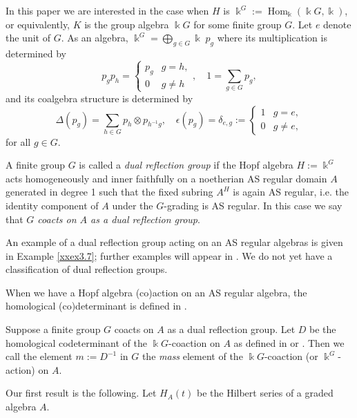 In this paper we are interested in the case
when $H$ is $\Bbbk^G:=\operatorname{Hom}_{\Bbbk}(\Bbbk G, \Bbbk)$, or 
equivalently, $K$ is the group algebra $\Bbbk G$ for some finite
group $G$. Let $e$ denote the unit of $G$. As an algebra,
$\Bbbk^G=\bigoplus_{g\in G} \Bbbk \; p_g$ where its multiplication 
is determined by
$$p_g p_h=\begin{cases} p_g & g=h,\\0 & g\neq h \end{cases}, 
\quad 1=\sum_{g\in G} p_g,$$
and its coalgebra structure is determined by
$$\Delta(p_g)=\sum_{h\in G} p_h \otimes p_{h^{-1}g}, \quad 
\epsilon(p_{g})=\delta_{e,g}:=\begin{cases} 1 & g=e,\\ 0 & g\neq e,
\end{cases}$$
for all $g\in G$. 

\begin{definition}
\label{xxdef0.1} A finite group $G$ is called a 
{\it dual reflection group} if the Hopf algebra $H:=\Bbbk^G$ acts
homogeneously and inner faithfully on a noetherian AS regular 
domain $A$ generated in degree 1 such that the fixed subring 
$A^H$ is again AS regular, i.e. the identity component of $A$ under the $G$-grading is AS regular. In this case we say that 
{\it $G$ coacts on $A$ as a dual reflection group}.  
\end{definition}

An example of a dual reflection group acting on an
AS regular algebras is given in Example \ref{xxex3.7}; further examples will appear in
\cite{KKZ5}.  We do not yet have a classification of dual reflection groups.

When we have a Hopf algebra (co)action on an AS regular
algebra, the homological (co)determinant is defined 
in \cite{KKZ3}.

\begin{definition}
\label{xxdef0.2} Suppose a finite group $G$ coacts on $A$ as a
dual reflection group. Let $D$ be the homological codeterminant
of the $\Bbbk G$-coaction on $A$ as defined in 
\cite[Definition {\rm{6.2}}]{KKZ3} or \cite[Definition 
{\rm{1.4(b)}}]{CWZ}. Then we call the element $m:=D^{-1}$ in $G$ the 
{\it mass} element of the $\Bbbk G$-coaction (or $\Bbbk^G$-action) 
on $A$.
\end{definition}

Our first result is the following. Let $H_A(t)$
be the Hilbert series of a graded algebra $A$. 

